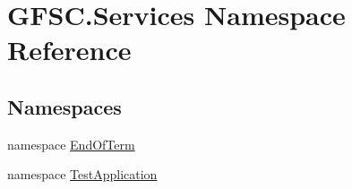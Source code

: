 \hypertarget{namespace_g_f_s_c_1_1_services}{}\section{G\+F\+S\+C.\+Services Namespace Reference}
\label{namespace_g_f_s_c_1_1_services}
\subsection*{Namespaces}
\begin{DoxyCompactItemize}
\item 
namespace \mbox{\hyperlink{namespace_g_f_s_c_1_1_services_1_1_end_of_term}{End\+Of\+Term}}
\item 
namespace \mbox{\hyperlink{namespace_g_f_s_c_1_1_services_1_1_test_application}{Test\+Application}}
\end{DoxyCompactItemize}

